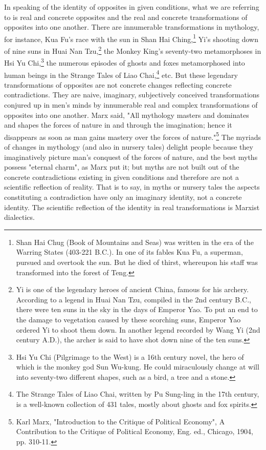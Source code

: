 \documentclass{article}
\begin{document}
In speaking of the identity of opposites in given conditions, what we are
referring to is real and concrete opposites and the real and concrete
transformations of opposites into one another. There are innumerable
transformations in mythology, for instance, Kua Fu's race with the sun in Shan
Hai Ching,\footnote{Shan Hai Chug (Book of Mountains and Seas) was written in
the era of the Warring States (403-221 B.C.). In one of its fables Kua Fu,
a superman, pursued and overtook the sun. But he died of thirst, whereupon his
staff was transformed into the forest of Teng.} Yi's shooting down of nine suns
in Huai Nan Tzu,\footnote{Yi is one of the legendary heroes of ancient China,
famous for his archery. According to a legend in Huai Nan Tzu, compiled in the
2nd century B.C., there were ten suns in the sky in the days of Emperor Yao. To
put an end to the damage to vegetation caused by these scorching suns, Emperor
Yao ordered Yi to shoot them down. In another legend recorded by Wang Yi (2nd
century A.D.), the archer is said to have shot down nine of the ten suns.} the
Monkey King's seventy-two metamorphoses in Hsi Yu Chi,\footnote{Hsi Yu Chi
(Pilgrimage to the West) is a 16th century novel, the hero of which is the
monkey god Sun Wu-kung. He could miraculously change at will into seventy-two
different shapes, such as a bird, a tree and a stone.} the numerous episodes of
ghosts and foxes metamorphosed into human beings in the Strange Tales of Liao
Chai,\footnote{The Strange Tales of Liao Chai, written by Pu Sung-ling in the
17th century, is a well-known collection of 431 tales, mostly about ghosts and
fox spirits.} etc. But these legendary transformations of opposites are not
concrete changes reflecting concrete contradictions. They are naive, imaginary,
subjectively conceived transformations conjured up in men's minds by
innumerable real and complex transformations of opposites into one another.
Marx said, "All mythology masters and dominates and shapes the forces of nature
in and through the imagination; hence it disappears as soon as man gains
mastery over the forces of nature."\footnote{Karl Marx, "Introduction to the
Critique of Political Economy", A Contribution to the Critique of Political
Economy, Eng. ed., Chicago, 1904, pp. 310-11.} The myriads of changes in
mythology (and also in nursery tales) delight people because they imaginatively
picture man's conquest of the forces of nature, and the best myths possess
"eternal charm", as Marx put it; but myths are not built out of the concrete
contradictions existing in given conditions and therefore are not a scientific
reflection of reality. That is to say, in myths or nursery tales the aspects
constituting a contradiction have only an imaginary identity, not a concrete
identity. The scientific reflection of the identity in real transformations is
Marxist dialectics.
\end{document}
